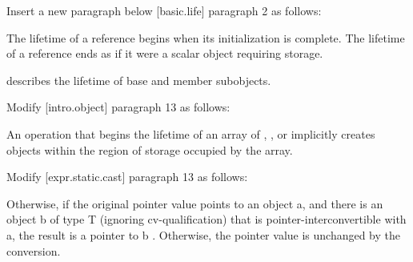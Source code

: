 Insert a new paragraph below [basic.life] paragraph 2 as follows:

\begin{adjustwidth}{0.5cm}{0.5cm}
The lifetime of a reference begins when its initialization is complete. The lifetime of a reference ends as if it were a scalar object requiring storage.

\begin{note} describes the lifetime of base and member subobjects.
\end{note}

\end{adjustwidth}


Modify [intro.object] paragraph 13 as follows:

\begin{adjustwidth}{0.5cm}{0.5cm}
An operation that begins the lifetime of an array of , , or  implicitly creates objects within the region of storage occupied by the array.
\end{adjustwidth}


Modify [expr.static.cast] paragraph 13 as follows:

\begin{adjustwidth}{0.5cm}{0.5cm}
Otherwise, if the original pointer value points to an object a, and there is an object b of type T (ignoring cv-qualification) that is pointer-interconvertible with a, the result is a pointer to b . Otherwise, the pointer value is unchanged by the conversion.
\end{adjustwidth}

